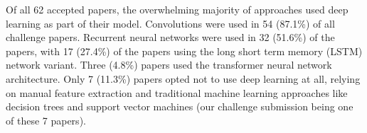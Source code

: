 \documentclass[\main/thesis.tex]{subfiles}
\begin{document}
Of all 62 accepted papers, the overwhelming majority of approaches used deep learning as part of their model.
Convolutions were used in 54 (87.1\%) of all challenge papers.
Recurrent neural networks were used in 32 (51.6\%) of the papers, with 17 (27.4\%) of the papers using the long short term memory (LSTM) network variant.
Three (4.8\%) papers used the transformer neural network architecture.
Only 7 (11.3\%) papers opted not to use deep learning at all, relying on manual feature extraction and traditional machine learning approaches like decision trees and support vector machines (our challenge submission being one of these 7 papers).



\end{document}
